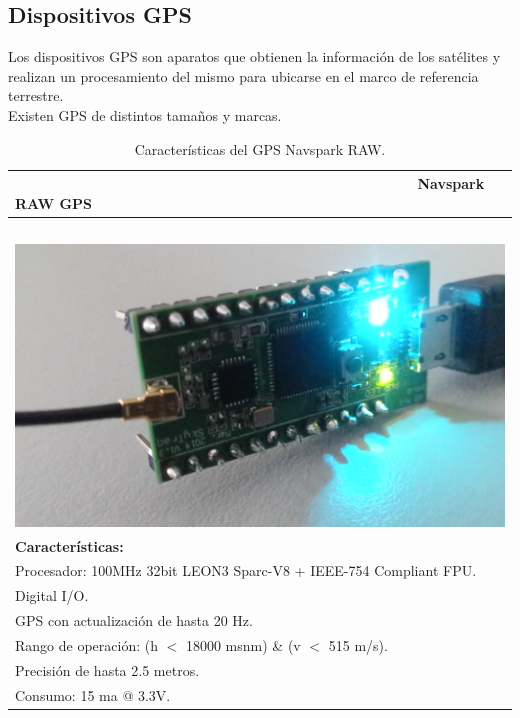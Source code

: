 \subsection{Dispositivos GPS}
Los dispositivos GPS son aparatos que obtienen la información de los satélites y realizan un procesamiento del mismo para ubicarse en el marco de referencia terrestre. \\

Existen GPS de distintos tamaños y marcas.

\newpage

\begin{table}[htb]
\begin{center}
\caption{Características del GPS Navspark RAW.}
\begin{tabular}{|l|}
	\hline
	        \ \ \ \ \ \ \ \ \ \ \ \ \ \ \ \ \ \ \ \ \ \ \ \ \ \ \ \ \ \ \ \ \ \ \ \ \ \ \ \ \ \ \ \ \ \ \ \ \ \ \textbf{Navspark RAW GPS} \\
	\hline
		\\  \ \ \ \ \ \ \ \ \ \ \ \ \ \ \ \ \ \ \ \ \ \ \ \ \ \ \ \ \ \ \ \ \ \ \ \ \ \ \ \ \includegraphics[width=0.37\linewidth]{Figures/NavGPS}
		\label{fig:nsraw}\\
	
	\textbf{Características:}\\
		\tabitem Procesador: 100MHz 32bit LEON3 Sparc-V8 + IEEE-754 Compliant FPU.\\
		\tabitem 17 Digital I/O.\\
		\tabitem GPS con actualización de hasta 20 Hz.\\
		\tabitem Rango de operación: (h $<$ 18000 msnm) \& (v $<$ 515 m/s).\\
		\tabitem Precisión de hasta 2.5 metros.\\
		\tabitem Consumo: 15 ma @ 3.3V.\\
	\hline
\end{tabular}
\end{center}
\end{table}

